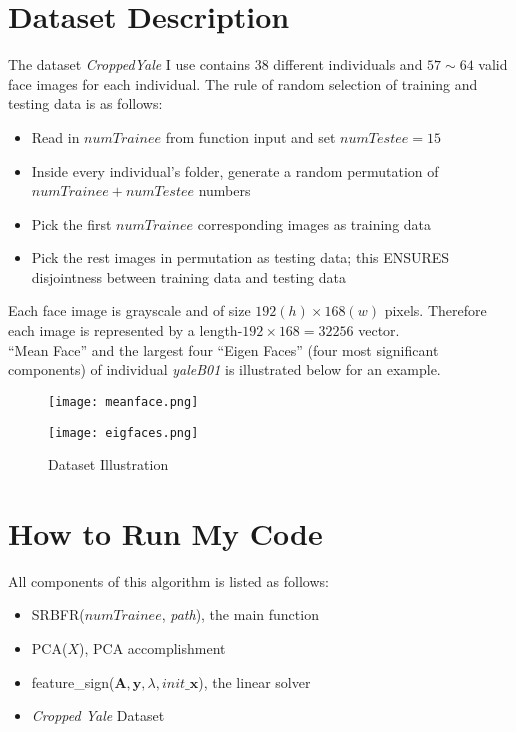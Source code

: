\documentclass[10pt,journal]{IEEEtran}
\renewcommand{\[}{\begin{equation*} \begin{aligned}} %
\renewcommand{\]}{\end{aligned} \end{equation*}}
\begin{document}
\section{\textbf{\large Dataset Description}}
The dataset \textit{CroppedYale} I use contains $38$ different individuals and $57 \sim 64$ valid face images for each individual. The rule of random selection of training and testing data is as follows:
\begin{itemize}
	\item Read in $numTrainee$ from function input and set $numTestee = 15$
	\item Inside every individual's folder, generate a random permutation of $numTrainee + numTestee$ numbers
	\item Pick the first $numTrainee$ corresponding images as training data
	\item Pick the rest images in permutation as testing data; this ENSURES disjointness between training data and testing data
\end{itemize}

Each face image is grayscale and of size $192(h) \times 168(w)$ pixels. Therefore each image is represented by a length-$192 \times 168 = 32256$ vector. \\

``Mean Face'' and the largest four ``Eigen Faces'' (four most significant components) of individual \textit{yaleB01} is illustrated below for an example.
\begin{figure}[H]
	\centering
	\texttt{[image: meanface.png]}
\end{figure}
\begin{figure}[H]
	\centering
	\texttt{[image: eigfaces.png]}
	\caption{Dataset Illustration}
\end{figure}

\section{\textbf{\large How to Run My Code}}
All components of this algorithm is listed as follows:
\begin{itemize}
	\item SRBFR($numTrainee$, \textit{path}), the main function
	\item PCA($X$), PCA accomplishment
	\item feature\_sign($\mathbf{A, y}, \lambda, init\_\mathbf{x}$), the linear solver
	\item \textit{Cropped Yale} Dataset
\end{itemize}
\end{document}
